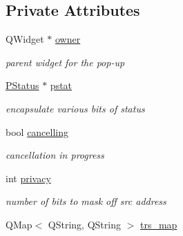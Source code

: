 \subsection*{Private Attributes}
\begin{CompactItemize}
\item 
\hypertarget{classTrDo_307c1b2dd82efb32f42ec5160676493e}{
QWidget $\ast$ \hyperlink{classTrDo_307c1b2dd82efb32f42ec5160676493e}{owner}}
\label{classTrDo_307c1b2dd82efb32f42ec5160676493e}

\begin{CompactList}\small\item\em parent widget for the pop-up \item\end{CompactList}\item 
\hypertarget{classTrDo_55091c42eba7b183155e67793afb06e0}{
\hyperlink{classPStatus}{PStatus} $\ast$ \hyperlink{classTrDo_55091c42eba7b183155e67793afb06e0}{pstat}}
\label{classTrDo_55091c42eba7b183155e67793afb06e0}

\begin{CompactList}\small\item\em encapsulate various bits of status \item\end{CompactList}\item 
\hypertarget{classTrDo_41b389c0ff9311ce7b51ebc50eab43c8}{
bool \hyperlink{classTrDo_41b389c0ff9311ce7b51ebc50eab43c8}{cancelling}}
\label{classTrDo_41b389c0ff9311ce7b51ebc50eab43c8}

\begin{CompactList}\small\item\em cancellation in progress \item\end{CompactList}\item 
\hypertarget{classTrDo_cdafeb531211dc81f62d1f9cc40ae604}{
int \hyperlink{classTrDo_cdafeb531211dc81f62d1f9cc40ae604}{privacy}}
\label{classTrDo_cdafeb531211dc81f62d1f9cc40ae604}

\begin{CompactList}\small\item\em number of bits to mask off src address \item\end{CompactList}\item 
\hypertarget{classTrDo_6e3e49c7d0ab9d28dec192698e5cb072}{
QMap$<$ QString, QString $>$ \hyperlink{classTrDo_6e3e49c7d0ab9d28dec192698e5cb072}{trs\_\-map}}
\label{classTrDo_6e3e49c7d0ab9d28dec192698e5cb072}


\end{CompactItemize}

